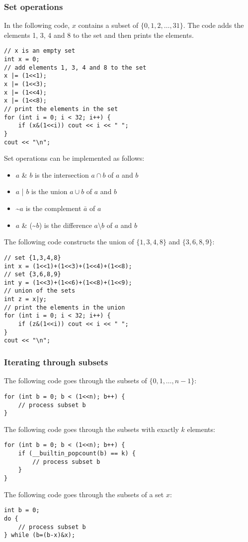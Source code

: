 \subsubsection{Set operations}

In the following code, $x$
contains a subset of $\{0,1,2,\ldots,31\}$.
The code adds the elements 1, 3, 4 and 8
to the set and then prints the elements.

\begin{lstlisting}
// x is an empty set
int x = 0;
// add elements 1, 3, 4 and 8 to the set
x |= (1<<1);
x |= (1<<3);
x |= (1<<4);
x |= (1<<8);
// print the elements in the set
for (int i = 0; i < 32; i++) {
    if (x&(1<<i)) cout << i << " ";
}
cout << "\n";
\end{lstlisting}

Set operations can be implemented as follows:
\begin{itemize}
\item $a$ \& $b$ is the intersection $a \cap b$ of $a$ and $b$
\item $a$ | $b$ is the union $a \cup b$ of $a$ and $b$
\item \textasciitilde$a$ is the complement $\bar a$ of $a$
\item $a$ \& (\textasciitilde$b$) is the difference
$a \setminus b$ of $a$ and $b$
\end{itemize}

The following code constructs the union
of $\{1,3,4,8\}$ and $\{3,6,8,9\}$:

\begin{lstlisting}
// set {1,3,4,8}
int x = (1<<1)+(1<<3)+(1<<4)+(1<<8);
// set {3,6,8,9}
int y = (1<<3)+(1<<6)+(1<<8)+(1<<9);
// union of the sets
int z = x|y;
// print the elements in the union
for (int i = 0; i < 32; i++) {
    if (z&(1<<i)) cout << i << " ";
}
cout << "\n";
\end{lstlisting}

\subsubsection{Iterating through subsets}

The following code goes through
the subsets of $\{0,1,\ldots,n-1\}$:

\begin{lstlisting}
for (int b = 0; b < (1<<n); b++) {
    // process subset b
}
\end{lstlisting}
The following code goes through
the subsets with exactly $k$ elements:
\begin{lstlisting}
for (int b = 0; b < (1<<n); b++) {
    if (__builtin_popcount(b) == k) {
        // process subset b
    }
}
\end{lstlisting}
The following code goes through the subsets
of a set $x$:
\begin{lstlisting}
int b = 0;
do {
    // process subset b
} while (b=(b-x)&x);
\end{lstlisting}

